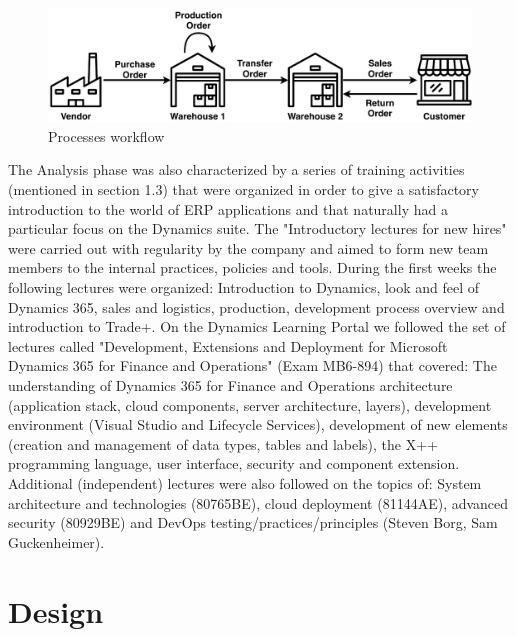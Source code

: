 \begin{figure}[ht]
	\centering
	\includegraphics[scale=0.7]{Images/workflow.pdf}
	\caption{Processes workflow}
	\label{fig:processesWorkflow}
\end{figure}

The Analysis phase was also characterized by a series of training activities (mentioned in section 1.3) that were organized in order to give a satisfactory introduction to the world of ERP applications and that naturally had a particular focus on the Dynamics suite. The "Introductory lectures for new hires" were carried out with regularity by the company and aimed to form new team members to the internal practices, policies and tools. During the first weeks the following lectures were organized: Introduction to Dynamics, look and feel of Dynamics 365, sales and logistics, production, development process overview and introduction to Trade+. On the Dynamics Learning Portal we followed the set of lectures called "Development, Extensions and Deployment for Microsoft Dynamics 365 for Finance and Operations" (Exam MB6-894) that covered: The understanding of Dynamics 365 for Finance and Operations architecture (application stack, cloud components, server architecture, layers), development environment (Visual Studio and Lifecycle Services), development of new elements (creation and management of data types, tables and labels), the X++ programming language, user interface, security and component extension. Additional (independent) lectures were also followed on the topics of: System architecture and technologies (80765BE), cloud deployment (81144AE), advanced security (80929BE) and DevOps testing/practices/principles (Steven Borg, Sam Guckenheimer).

\enlargethispage{-\baselineskip}
\enlargethispage{-\baselineskip}

\section{Design} 

